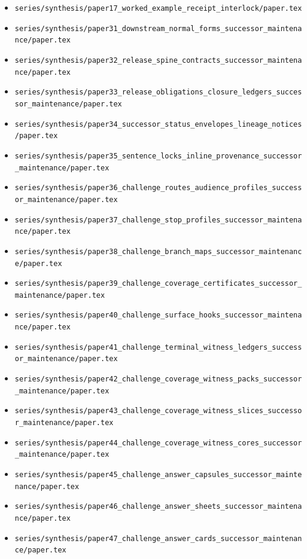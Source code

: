 \documentclass[11pt]{article}
\begin{document}
\begin{itemize}[leftmargin=*]
\item \texttt{series/synthesis/paper17\_worked\_example\_receipt\_interlock/paper.tex}
\item \texttt{series/synthesis/paper31\_downstream\_normal\_forms\_successor\_maintenance/paper.tex}
\item \texttt{series/synthesis/paper32\_release\_spine\_contracts\_successor\_maintenance/paper.tex}
\item \texttt{series/synthesis/paper33\_release\_obligations\_closure\_ledgers\_successor\_maintenance/paper.tex}
\item \texttt{series/synthesis/paper34\_successor\_status\_envelopes\_lineage\_notices/paper.tex}
\item \texttt{series/synthesis/paper35\_sentence\_locks\_inline\_provenance\_successor\_maintenance/paper.tex}
\item \texttt{series/synthesis/paper36\_challenge\_routes\_audience\_profiles\_successor\_maintenance/paper.tex}
\item \texttt{series/synthesis/paper37\_challenge\_stop\_profiles\_successor\_maintenance/paper.tex}
\item \texttt{series/synthesis/paper38\_challenge\_branch\_maps\_successor\_maintenance/paper.tex}
\item \texttt{series/synthesis/paper39\_challenge\_coverage\_certificates\_successor\_maintenance/paper.tex}
\item \texttt{series/synthesis/paper40\_challenge\_surface\_hooks\_successor\_maintenance/paper.tex}
\item \texttt{series/synthesis/paper41\_challenge\_terminal\_witness\_ledgers\_successor\_maintenance/paper.tex}
\item \texttt{series/synthesis/paper42\_challenge\_coverage\_witness\_packs\_successor\_maintenance/paper.tex}
\item \texttt{series/synthesis/paper43\_challenge\_coverage\_witness\_slices\_successor\_maintenance/paper.tex}
\item \texttt{series/synthesis/paper44\_challenge\_coverage\_witness\_cores\_successor\_maintenance/paper.tex}
\item \texttt{series/synthesis/paper45\_challenge\_answer\_capsules\_successor\_maintenance/paper.tex}
\item \texttt{series/synthesis/paper46\_challenge\_answer\_sheets\_successor\_maintenance/paper.tex}
\item \texttt{series/synthesis/paper47\_challenge\_answer\_cards\_successor\_maintenance/paper.tex}

\end{itemize}
\end{document}
